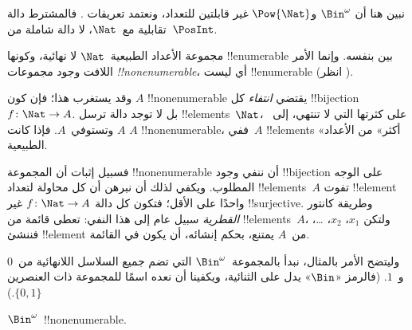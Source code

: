 \documentclass[../../../include/open-logic-section]{subfiles}
\begin{document}


\begin{editorial}
نبين هنا أن $\Bin^\omega$ و$\Pow{\Nat}$ غير قابلتين للتعداد، ونعتمد تعريفات . فالمشترط دالة تقابلية مع~$\Nat$، لا دالة شاملة من~$\PosInt$.
\end{editorial}

\begin{explain}
مجموعة الأعداد الطبيعية~$\Nat$ لا نهائية، وكونها !!{enumerable} بين بنفسه. وإنما الأمر اللافت وجود مجموعات \emph{!!{nonenumerable}}، أي ليست !!{enumerable} (انظر ).

وقد يستغرب هذا؛ فإن كون $A$ !!{nonenumerable} يقتضي \emph{انتفاء} كل !!{bijection} $f
\colon \Nat \to A$. بل لا توجد دالة ترسل !!{element}s~$\Nat$، على كثرتها التي لا تنتهي، إلى~$A$ وتستوفي~$A$. فإذا كانت $A$ !!{nonenumerable}، ففي~$A$ !!{element}s «أكثر» من الأعداد الطبيعية.

فسبيل إثبات أن المجموعة !!{nonenumerable} أن ننفي وجود !!{bijection} على الوجه المطلوب. ويكفي لذلك أن نبرهن أن كل محاولة لتعداد !!{element}s~$A$ تفوت !!{element} واحدًا على الأقل؛ فتكون كل دالة $f\colon \Nat \to A$ غير !!{surjective}. وطريقة كانتور \emph{القطرية} سبيل عام إلى هذا النفي: تعطى قائمة من !!{element}s~$A$، ولتكن $x_1$، $x_2$، \dots، فننشئ !!{element} من~$A$ يمتنع، بحكم إنشائه، أن يكون في القائمة.

وليتضح الأمر بالمثال، نبدأ بالمجموعة~$\Bin^\omega$ التي تضم جميع السلاسل اللانهائية من~$0$ و~$1$. (فالرمز «$\Bin$» يدل على الثنائية، ويكفينا أن نعده اسمًا للمجموعة ذات العنصرين $\{0,1\}$.)
\end{explain}

\begin{thm}
$\Bin^\omega$~!!{nonenumerable}.
\end{thm}
\end{document}
